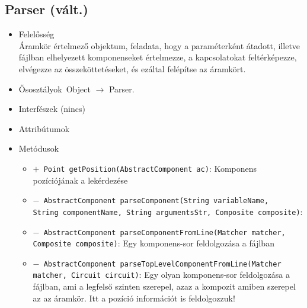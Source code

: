 \subsection{Parser (vált.)}
\begin{itemize}
\item Felelősség\\
Áramkör értelmező objektum, feladata, hogy a paraméterként átadott, illetve  fájlban elhelyezett komponenseket értelmezze, a kapcsolatokat feltérképezze,  elvégezze az összeköttetéseket, és ezáltal felépítse az áramkört.
\item Ősosztályok\ Object $\rightarrow{}$ Parser.
\item Interfészek (nincs)
\item Attribútumok $\ $
\item Metódusok$\ $
\begin{itemize}
	\item[] \texttt{$+$ Point getPosition(AbstractComponent ac)}: Komponens pozíciójának a lekérdezése
	\item[] \texttt{$-$ AbstractComponent parseComponent(String variableName,}\\\texttt{String componentName, String argumentsStr, Composite composite)}: 
	\item[] \texttt{$-$ AbstractComponent parseComponentFromLine(Matcher matcher, Composite composite)}: Egy komponens-sor feldolgozása a fájlban
	\item[] \texttt{$-$ AbstractComponent parseTopLevelComponentFromLine(Matcher matcher, Circuit circuit)}: Egy olyan komponens-sor feldolgozása a fájlban, ami a legfelső szinten szerepel,  azaz a kompozit amiben szerepel az az áramkör. Itt a pozíció információt is feldolgozzuk!
\end{itemize}
\end{itemize}